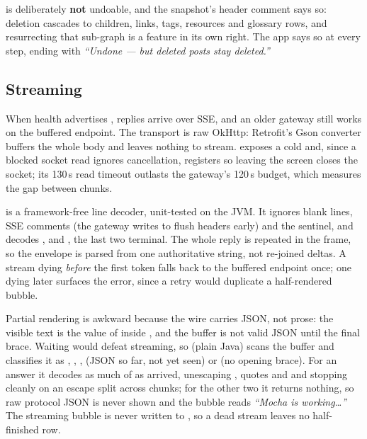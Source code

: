  is deliberately \textbf{not} undoable, and the snapshot's header comment says so:
deletion cascades to children, links, tags, resources and glossary rows, and resurrecting that sub-graph is
a feature in its own right. The app says so at every step, ending with \emph{``Undone --- but deleted posts
stay deleted.''}

\subsection{Streaming}

When health advertises , replies arrive over SSE, and an older gateway still works on the
buffered endpoint. The transport is raw OkHttp: Retrofit's Gson converter buffers the whole body and leaves
nothing to stream.  exposes a cold  and, since a blocked socket
read ignores cancellation, registers  so leaving the screen
closes the socket; its 130\,s read timeout outlasts the gateway's 120\,s budget, which measures the gap
between chunks.

 is a framework-free line decoder, unit-tested on the JVM. It ignores blank lines, SSE
comments (the gateway writes  to flush headers early) and the \code{[DONE]} sentinel, and
decodes ,  and , the last two terminal. The
whole reply is repeated in the  frame, so the envelope is parsed from one authoritative string,
not re-joined deltas. A stream dying \emph{before} the first token falls back to the buffered endpoint once;
one dying later surfaces the error, since a retry would duplicate a half-rendered bubble.

Partial rendering is awkward because the wire carries JSON, not prose: the visible text is the value of
 inside , and the buffer is not valid JSON until the
final brace. Waiting would defeat streaming, so  (plain Java) scans the
buffer and classifies it as , , ,  (JSON so
far,  not yet seen) or  (no opening brace). For an answer it decodes as much of
 as arrived, unescaping , quotes and  and
stopping cleanly on an escape split across chunks; for the other two it returns nothing, so raw protocol
JSON is never shown and the bubble reads \emph{``Mocha is working\dots''} The streaming bubble is never
written to , so a dead stream leaves no half-finished row.


